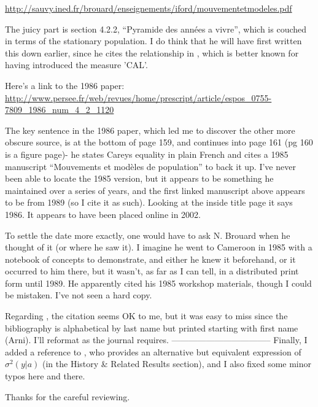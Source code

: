 \documentclass{article}
\begin{document}
\url{http://sauvy.ined.fr/brouard/enseignements/iford/mouvementetmodeles.pdf}

The juicy part is section 4.2.2, ``Pyramide des ann\'{e}es a vivre'', which is
couched in terms of the stationary population. I do think that he will have
first written this down earlier, since he cites the relationship in
\citet{brouard1986structure}, which is better known for having introduced the
measure 'CAL'.

Here's a link to the 1986 paper: 
\url{http://www.persee.fr/web/revues/home/prescript/article/espos_0755-7809_1986_num_4_2_1120}

The key sentence in the  1986 paper, which led me to discover the other more
obscure source, is at the bottom of page 159, and continues into page 161 (pg
160 is a figure page)- he states Careys equality in plain French and cites a 1985 manuscript ``Mouvements et mod\`{e}les de population''
to back it up. I've never been able to locate the 1985 version, but it appears
to be something he maintained over a series of years, and the
first linked manuscript above appears to be from 1989 (so I cite it as such). Looking at the inside title page it says 1986. It appears to have been placed online in 2002.

To settle the date more exactly, one would have to ask N. Brouard when he
thought of it (or where he saw it). I imagine he went to Cameroon in 1985 with a
notebook of concepts to demonstrate, and either he knew it beforehand, or it occurred to him there, but it wasn't, as far as I
can tell, in a distributed print form until 1989. He apparently cited his 1985
workshop materials, though I could be mistaken. I've not seen a hard copy.

Regarding \citet{rao2014generalization}, the citation seems OK to me, but it was
easy to miss since the bibliography is alphabetical by last name but printed
starting with first name (Arni). I'll reformat as the journal requires.
-----------------------------------
Finally, I added a reference to \citet{chiang1984life}, who provides an
alternative but equivalent expression of $\sigma^2(y|a)$ (in the History \&
Related Results section), and I also fixed some minor typos here and there.

Thanks for the careful reviewing.


   
\end{document}
